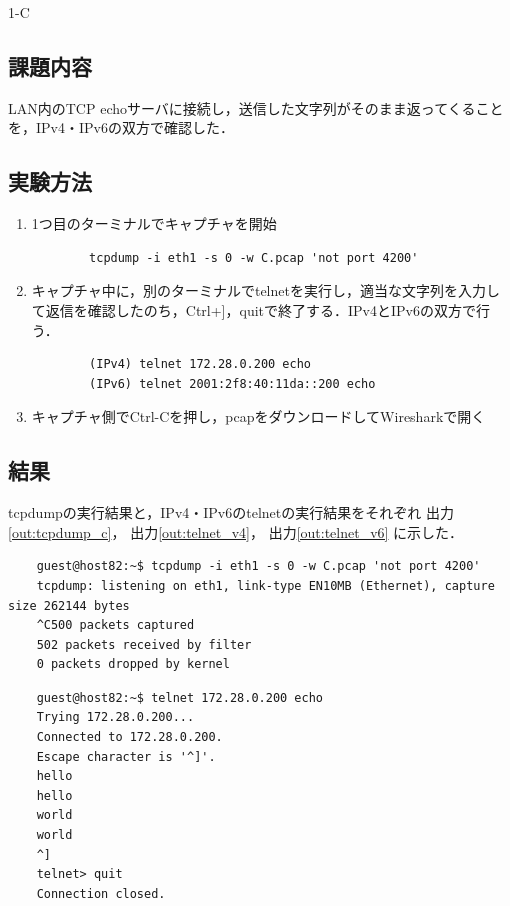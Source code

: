 \begin{maintask}{1-C}
  \subsection*{課題内容}
  LAN内のTCP echoサーバに接続し，送信した文字列がそのまま返ってくることを，IPv4・IPv6の双方で確認した．

  \subsection*{実験方法}
  \begin{enumerate}
    \item 1つ目のターミナルでキャプチャを開始
      \begin{verbatim}
        tcpdump -i eth1 -s 0 -w C.pcap 'not port 4200'
      \end{verbatim}

    \item キャプチャ中に，別のターミナルでtelnetを実行し，適当な文字列を入力して返信を確認したのち，Ctrl+]，quitで終了する．IPv4とIPv6の双方で行う．
      \begin{verbatim}
        (IPv4) telnet 172.28.0.200 echo
        (IPv6) telnet 2001:2f8:40:11da::200 echo
      \end{verbatim}

    \item キャプチャ側でCtrl-Cを押し，pcapをダウンロードしてWiresharkで開く
  \end{enumerate}

  \subsection*{結果}
  tcpdumpの実行結果と，IPv4・IPv6のtelnetの実行結果をそれぞれ
  出力\ref{out:tcpdump_c}，
  出力\ref{out:telnet_v4}，
  出力\ref{out:telnet_v6}
  に示した．

  \begin{termout}[H]
    \caption{tcpdump の実行結果}\label{out:tcpdump_c}
    \begin{verbatim}
    guest@host82:~$ tcpdump -i eth1 -s 0 -w C.pcap 'not port 4200'
    tcpdump: listening on eth1, link-type EN10MB (Ethernet), capture size 262144 bytes
    ^C500 packets captured
    502 packets received by filter
    0 packets dropped by kernel
    \end{verbatim}
  \end{termout}

  \begin{termout}[H]
    \caption{telnet(IPv4) の実行結果}\label{out:telnet_v4}
    \begin{verbatim}
    guest@host82:~$ telnet 172.28.0.200 echo
    Trying 172.28.0.200...
    Connected to 172.28.0.200.
    Escape character is '^]'.
    hello
    hello
    world
    world
    ^]
    telnet> quit
    Connection closed.
    \end{verbatim}
  \end{termout}


\end{maintask}

